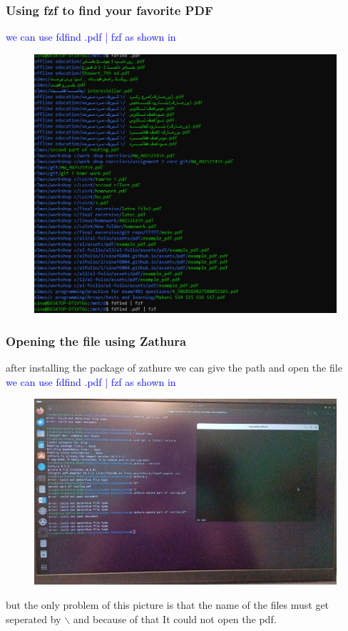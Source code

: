 \documentclass[titlepage]{article}
\begin{document}
\subsubsection{Using fzf to find your favorite PDF}
\textcolor{blue}{we can use fdfind .pdf | fzf as shown in} 
\begin{figure}[h]
\centering
\includegraphics[width = 1.2\textwidth]{fzf2}
\end {figure}
\newpage
\subsubsection{Opening the file using Zathura}
after installing the package of zathure we can give the path and open the file\\
\textcolor{blue}{we can use fdfind .pdf | fzf as shown in} 
\begin{figure}[h]
\centering
\includegraphics[width = 1.2\textwidth]{ssss}
\end {figure}
but the only problem of this picture is that the name of the files must get seperated by $\backslash$ and because of that It could not open the pdf.
\end{document}

